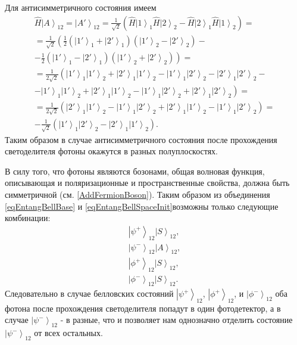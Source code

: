 Для антисимметричного состояния имеем
\begin{eqnarray}
\hat{H}\left|A\right>_{12} = \left|A'\right>_{12} = 
\frac{1}{\sqrt{2}}
\left(
\hat{H}\left|1\right>_1\hat{H}\left|2\right>_2 -
\hat{H}\left|2\right>_1\hat{H}\left|1\right>_2
\right) = 
\nonumber \\
=
\frac{1}{\sqrt{2}}
\left(
\frac{1}{2}
\left(\left|1'\right>_1 +
\left|2'\right>_1\right)
\left(\left|1'\right>_2 -
\left|2'\right>_2\right) -
\right.
\nonumber \\
- \left.
\frac{1}{2}
\left(\left|1'\right>_1 -
\left|2'\right>_1\right)
\left(\left|1'\right>_2 +
\left|2'\right>_2\right)
\right) = 
\nonumber \\
=
\frac{1}{2 \sqrt{2}}
\left(
\left|1'\right>_1 \left|1'\right>_2 +
\left|2'\right>_1 \left|1'\right>_2 -
\left|1'\right>_1 \left|2'\right>_2 -
\left|2'\right>_1 \left|2'\right>_2 -
\right. 
\nonumber \\
- \left.
\left|1'\right>_1 \left|1'\right>_2 +
\left|2'\right>_1 \left|1'\right>_2 -
\left|1'\right>_1 \left|2'\right>_2 +
\left|2'\right>_1 \left|2'\right>_2
\right) =
\nonumber \\
=
\frac{1}{2 \sqrt{2}}
\left(
\left|2'\right>_1 \left|1'\right>_2 
- \left|1'\right>_1 \left|2'\right>_2 
+ \left|2'\right>_1 \left|1'\right>_2 
- \left|1'\right>_1 \left|2'\right>_2
\right) = 
\nonumber \\
- \frac{1}{\sqrt{2}}
\left(
\left|1'\right>_1 \left|2'\right>_2 
- \left|2'\right>_1 \left|1'\right>_2 
\right).
\nonumber
\end{eqnarray}
Таким образом в случае антисимметричного состояния после прохождения
светоделителя фотоны окажутся в разных полуплоскостях.

В силу того, что фотоны являются бозонами, общая волновая функция,
описывающая и поляризационные и пространственные свойства,
должна быть симметричной \cite{bFeinman}
(см. \autoref{AddFermionBoson}). Таким образом из объединения 
\eqref{eqEntangBellBase} и \eqref{eqEntangBellSpaceInit}возможны
только следующие комбинации:
\begin{eqnarray}
\left|\psi^{+}\right>_{12}\left|S\right>_{12},
\nonumber \\ 
\left|\psi^{-}\right>_{12}\left|A\right>_{12}, 
\nonumber \\ 
\left|\phi^{+}\right>_{12}\left|S\right>_{12}, 
\nonumber \\ 
\left|\phi^{-}\right>_{12}\left|S\right>_{12}.
\nonumber
\end{eqnarray}
Следовательно в случае белловских состояний 
$\left|\psi^{+}\right>_{12}$, $\left|\phi^{+}\right>_{12}$, и
$\left|\phi^{-}\right>_{12}$ оба фотона после прохождения
светоделителя попадут в один фотодетектор, а в случае
$\left|\psi^{-}\right>_{12}$ - в разные, что и позволяет нам
однозначно отделить состояние $\left|\psi^{-}\right>_{12}$ от всех
остальных. 

